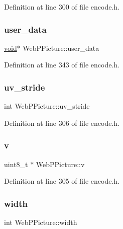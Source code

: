 Definition at line 300 of file encode.\+h.

\mbox{\label{struct_web_p_picture_aca441ad043004158d3cb14570247ca36}} 
\subsubsection{\texorpdfstring{user\_data}{user\_data}}
{\footnotesize\ttfamily \mbox{\hyperlink{_s_d_l__opengles2__gl2ext_8h_ae5d8fa23ad07c48bb609509eae494c95}{void}}$\ast$ Web\+P\+Picture\+::user\+\_\+data}



Definition at line 343 of file encode.\+h.

\mbox{\label{struct_web_p_picture_a302e79b710cff94b46432066d267db21}} 
\subsubsection{\texorpdfstring{uv\_stride}{uv\_stride}}
{\footnotesize\ttfamily int Web\+P\+Picture\+::uv\+\_\+stride}



Definition at line 306 of file encode.\+h.

\mbox{\label{struct_web_p_picture_a7b502a9b9b14185a490a05deefda438a}} 
\subsubsection{\texorpdfstring{v}{v}}
{\footnotesize\ttfamily uint8\+\_\+t $\ast$ Web\+P\+Picture\+::v}



Definition at line 305 of file encode.\+h.

\mbox{\label{struct_web_p_picture_a100898a4048f95fc6c91558aceaa99df}} 
\subsubsection{\texorpdfstring{width}{width}}
{\footnotesize\ttfamily int Web\+P\+Picture\+::width}



